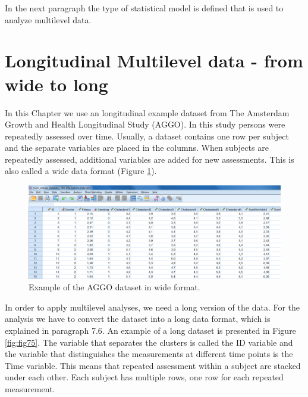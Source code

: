 \documentclass[
]{book}
\begin{document}
In the next paragraph the type of statistical model is defined that is used to analyze multilevel data.

\hypertarget{longitudinal-multilevel-data---from-wide-to-long}{%
\section{Longitudinal Multilevel data - from wide to long}\label{longitudinal-multilevel-data---from-wide-to-long}}

In this Chapter we use an longitudinal example dataset from The Amsterdam Growth and Health Longitudinal Study (AGGO). In this study persons were repeatedly assessed over time. Usually, a dataset contains one row per subject and the separate variables are placed in the columns. When subjects are repeatedly assessed, additional variables are added for new assessments. This is also called a wide data format (Figure \ref{fig:fig74}).

\begin{figure}

{\centering \includegraphics[width=0.9\linewidth]{images/fig7.2} 

}

\caption{Example of the AGGO dataset in wide format.}\label{fig:fig74}
\end{figure}

In order to apply multilevel analyses, we need a long version of the data. For the analysis we have to convert the dataset into a long data format, which is explained in paragraph 7.6. An example of a long dataset is presented in Figure \ref{fig:fig75}. The variable that separates the clusters is called the ID variable and the variable that distinguishes the measurements at different time points is the Time variable. This means that repeated assessment within a subject are stacked under each other. Each subject has multiple rows, one row for each repeated measurement.
\end{document}
